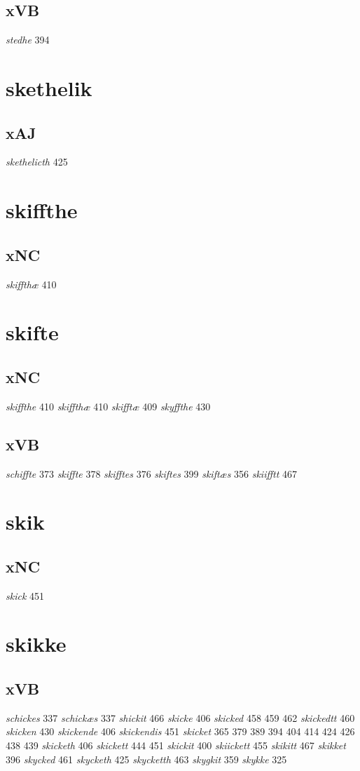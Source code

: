\documentclass[a4paper,twocolumn]{article}
\begin{document}
\subsection{xVB}
\label{sec:org0d0f3f9}
\emph{stedhe} 394 
\section{skethelik}
\label{sec:orgd1ed100}
\subsection{xAJ}
\label{sec:org8fca003}
\emph{skethelicth} 425 
\section{skiffthe}
\label{sec:org383475f}
\subsection{xNC}
\label{sec:org82e7159}
\emph{skiffthæ} 410 
\section{skifte}
\label{sec:org0bd1107}
\subsection{xNC}
\label{sec:org908dcdb}
\emph{skiffthe} 410 \emph{skiffthæ} 410 \emph{skifftæ} 409 \emph{skyffthe} 430 
\subsection{xVB}
\label{sec:orgc59da29}
\emph{schiffte} 373 \emph{skiffte} 378 \emph{skifftes} 376 \emph{skiftes} 399 \emph{skiftæs} 356 \emph{skiifftt} 467 
\section{skik}
\label{sec:org212b814}
\subsection{xNC}
\label{sec:org22f0c9e}
\emph{skick} 451 
\section{skikke}
\label{sec:org5650698}
\subsection{xVB}
\label{sec:org9ff609f}
\emph{schickes} 337 \emph{schickæs} 337 \emph{shickit} 466 \emph{skicke} 406 \emph{skicked} 458 459 462 \emph{skickedtt} 460 \emph{skicken} 430 \emph{skickende} 406 \emph{skickendis} 451 \emph{skicket} 365 379 389 394 404 414 424 426 438 439 \emph{skicketh} 406 \emph{skickett} 444 451 \emph{skickit} 400 \emph{skiickett} 455 \emph{skikitt} 467 \emph{skikket} 396 \emph{skycked} 461 \emph{skycketh} 425 \emph{skycketth} 463 \emph{skygkit} 359 \emph{skykke} 325 
\end{document}
